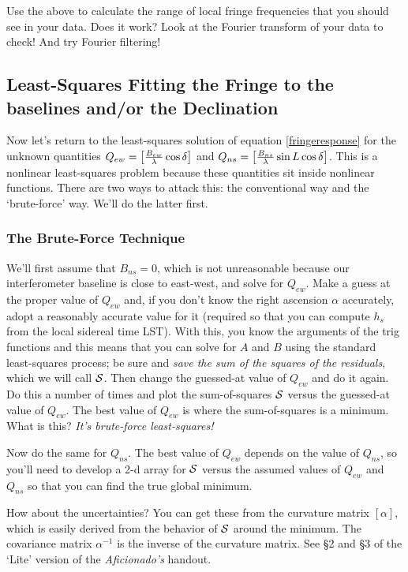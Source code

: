 \documentclass[11pt,preprint]{aastex}
\begin{document}
Use the above to calculate the range of local fringe frequencies that
you should see in your data. Does it work? Look at the Fourier transform
of your data to check! And try Fourier filtering!

\subsection{Least-Squares Fitting the Fringe to the baselines and/or the
  Declination}

Now let's return to the least-squares solution of equation
\ref{fringeresponse} for the unknown quantities $Q_{ew} = \left[{B_{ew}
    \over \lambda} \cos \delta \right]$ and $Q_{ns}= \left[{B_{ns} \over
    \lambda} \sin L \cos \delta \right]$.
This is a nonlinear least-squares problem because these quantities sit
inside nonlinear functions. There are two ways to attack this: the
conventional way and the `brute-force' way. We'll do the latter first.

\subsubsection{The Brute-Force Technique}
We'll first assume that $B_{ns}=0$, which is not unreasonable because
our interferometer baseline is close to east-west, and solve for
$Q_{ew}$. Make a guess at the proper value of $Q_{ew}$ and, if you don't
know the right ascension $\alpha$ accurately, adopt a reasonably
accurate value for it (required so that you can compute $h_s$ from the
local sidereal time LST).  With this, you know the arguments of the trig
functions and this means that you can solve for $A$ and $B$ using the
standard least-squares process; be sure and {\it save the sum of the
  squares of the residuals}, which we will call $\cal S$.  Then change
the guessed-at value of $Q_{ew}$ and do it again.  Do this a number of
times and plot the sum-of-squares $\cal S$ versus the guessed-at value
of $Q_{ew}$.  The best value of
$Q_{ew}$ is where the sum-of-squares is a minimum.  What is this?  {\it
It's brute-force least-squares!}

Now do the same for $Q_{ns}$. The best value of $Q_{ew}$ depends on the
value of $Q_{ns}$, so you'll need to develop a 2-d array for $\cal S$
versus the assumed values of $Q_{ew}$ and $Q_{ns}$ so that you can find
the true global minimum. 

How about the uncertainties? You can get these from the curvature
matrix $[\alpha]$, which is easily derived from the behavior of $\cal
S$ around the minimum. The covariance matrix $\alpha^{-1}$ is the
inverse of the curvature matrix. See \S 2 and \S 3 of
the `Lite' version of the {\it Aficionado's} handout.
\end{document}
